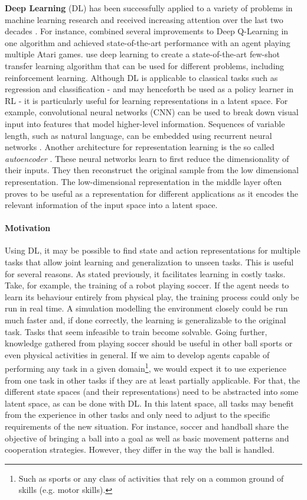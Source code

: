 \textbf{Deep Learning} (DL) has been successfully applied to a variety of problems in machine learning research and received increasing attention over the last two decades \citep{goodfellow2016deep}. For instance, \citet{hessel2017rainbow} combined several  improvements to Deep Q-Learning in one algorithm and achieved state-of-the-art performance with an agent playing multiple Atari games. \cite{finn2018model} use deep learning to create a state-of-the-art few-shot transfer learning algorithm that can be used for different problems, including reinforcement learning. Although DL is applicable to classical tasks such as regression and classification - and may henceforth be used as a policy learner in RL - it is particularly useful for learning representations in a latent space. For example, convolutional neural networks (CNN) can be used to break down visual input into features that model higher-level information. Sequences of variable length, such as natural language, can be embedded using recurrent neural networks \citep{goldberg2017neural}. Another architecture for representation learning is the so called \textit{autoencoder} \citep{hinton2006reducing}. These neural networks learn to first reduce the dimensionality of their inputs. They then reconstruct the original sample from the low dimensional representation. The low-dimensional representation in the middle layer often proves to be useful as a representation for different applications as it encodes the relevant information of the input space into a latent space. 

\paragraph{Motivation} Using DL, it may be possible to find state and action representations for multiple tasks that allow joint learning and generalization to unseen tasks. This is useful for several reasons. As stated previously, it facilitates learning in costly tasks. Take, for example, the training of a robot playing soccer. If the agent needs to learn its behaviour entirely from physical play, the training process could only be run in real time. A simulation modelling the environment closely could be run much faster and, if done correctly, the learning is generalizable to the original task. Tasks that seem infeasible to train become solvable. Going further, knowledge gathered from playing soccer should be useful in other ball sports or even physical activities in general. If we aim to develop agents capable of performing any task in a given domain\footnote{Such as sports or any class of activities that rely on a common ground of skills (e.g. motor skills).}, we would expect it to use experience from one task in other tasks if they are at least partially applicable. For that, the different state spaces (and their representations) need to be abstracted into some latent space, as can be done with DL. In this latent space, all tasks may benefit from the experience in other tasks and only need to adjust to the specific requirements of the new situation. For instance, soccer and handball share the objective of bringing a ball into a goal as well as basic movement patterns and cooperation strategies. However, they differ in the way the ball is handled.

